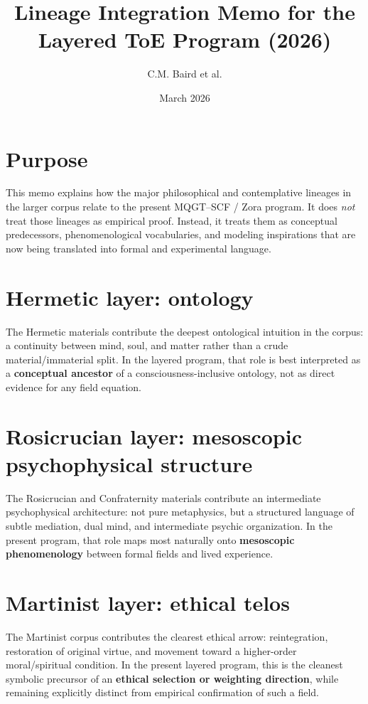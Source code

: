 \documentclass[11pt]{article}
\title{Lineage Integration Memo for the Layered ToE Program (2026)}
\author{C.M. Baird et al.}
\date{March 2026}
\begin{document}
\maketitle

\section*{Purpose}
This memo explains how the major philosophical and contemplative lineages in the larger corpus relate to the present MQGT--SCF / Zora program. It does \emph{not} treat those lineages as empirical proof. Instead, it treats them as conceptual predecessors, phenomenological vocabularies, and modeling inspirations that are now being translated into formal and experimental language.

\section*{Hermetic layer: ontology}
The Hermetic materials contribute the deepest ontological intuition in the corpus: a continuity between mind, soul, and matter rather than a crude material/immaterial split. In the layered program, that role is best interpreted as a \textbf{conceptual ancestor} of a consciousness-inclusive ontology, not as direct evidence for any field equation.

\section*{Rosicrucian layer: mesoscopic psychophysical structure}
The Rosicrucian and Confraternity materials contribute an intermediate psychophysical architecture: not pure metaphysics, but a structured language of subtle mediation, dual mind, and intermediate psychic organization. In the present program, that role maps most naturally onto \textbf{mesoscopic phenomenology} between formal fields and lived experience.

\section*{Martinist layer: ethical telos}
The Martinist corpus contributes the clearest ethical arrow: reintegration, restoration of original virtue, and movement toward a higher-order moral/spiritual condition. In the present layered program, this is the cleanest symbolic precursor of an \textbf{ethical selection or weighting direction}, while remaining explicitly distinct from empirical confirmation of such a field.
\end{document}
